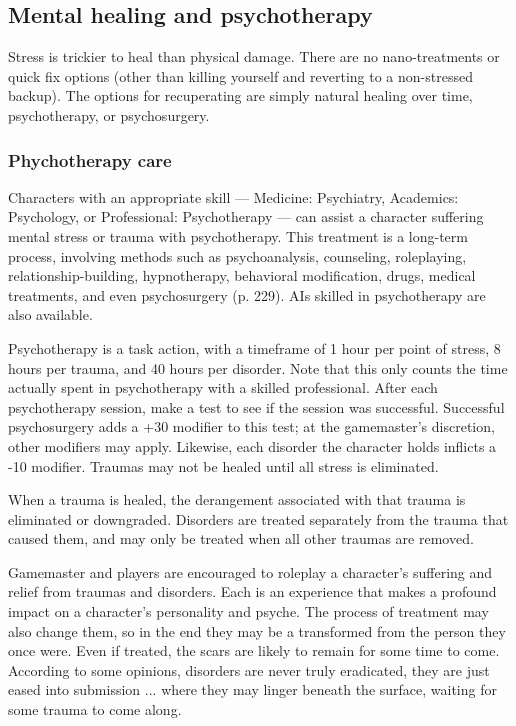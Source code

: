 \subsection{Mental healing and psychotherapy} \label{sec:mental-healing-psychotherapy} 

Stress is trickier to heal than physical damage. There are no nano-treatments or quick fix options (other than killing yourself and reverting to a non-stressed backup). The options for recuperating are simply natural healing over time, psychotherapy, or psychosurgery. 

\subsubsection{Phychotherapy care} 

Characters with an appropriate skill --- Medicine: Psychiatry, Academics: Psychology, or Professional: Psychotherapy --- can assist a character suffering mental stress or trauma with psychotherapy. This treatment is a long-term process, involving methods such as psychoanalysis, counseling, roleplaying, relationship-building, hypnotherapy, behavioral modification, drugs, medical treatments, and even psychosurgery (p. 229). AIs skilled in psychotherapy are also available. 

Psychotherapy is a task action, with a timeframe of 1 hour per point of stress, 8 hours per trauma, and 40 hours per disorder. Note that this only counts the time actually spent in psychotherapy with a skilled professional. After each psychotherapy session, make a test to see if the session was successful. Successful psychosurgery adds a +30 modifier to this test; at the gamemaster’s discretion, other modifiers may apply. Likewise, each disorder the character holds inflicts a -10 modifier. Traumas may not be healed until all stress is eliminated. 

When a trauma is healed, the derangement associated with that trauma is eliminated or downgraded. Disorders are treated separately from the trauma that caused them, and may only be treated when all other traumas are removed. 

Gamemaster and players are encouraged to roleplay a character’s suffering and relief from traumas and disorders. Each is an experience that makes a profound impact on a character’s personality and psyche. The process of treatment may also change them, so in the end they may be a transformed from the person they once were. Even if treated, the scars are likely to remain for some time to come. According to some opinions, disorders are never truly eradicated, they are just eased into submission ... where they may linger beneath the surface, waiting for some trauma to come along. 

